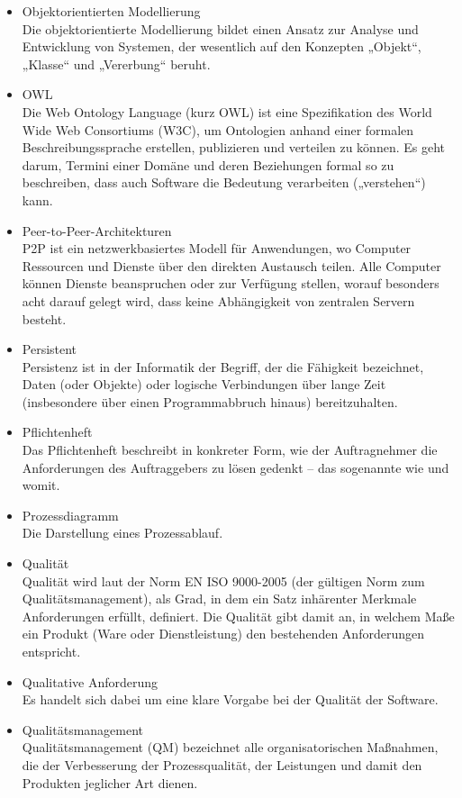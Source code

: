 \begin{itemize}
\item 	Objektorientierten Modellierung\\Die objektorientierte Modellierung bildet einen Ansatz zur Analyse und Entwicklung von Systemen, der wesentlich auf den Konzepten „Objekt“, „Klasse“ und „Vererbung“ beruht.
\item 	OWL\\
Die Web Ontology Language (kurz OWL) ist eine Spezifikation des World Wide Web Consortiums (W3C), um Ontologien anhand einer formalen Beschreibungssprache erstellen, publizieren und verteilen zu können. Es geht darum, Termini einer Domäne und deren Beziehungen formal so zu beschreiben, dass auch Software die Bedeutung verarbeiten („verstehen“) kann.
\item 	Peer-to-Peer-Architekturen\\
P2P ist ein netzwerkbasiertes Modell für Anwendungen, wo Computer Ressourcen und
Dienste über den direkten Austausch teilen. Alle Computer können Dienste beanspruchen
oder zur Verfügung stellen, worauf besonders acht darauf gelegt wird, dass keine
Abhängigkeit von zentralen Servern besteht.
\item 	Persistent\\Persistenz ist in der Informatik der Begriff, der die Fähigkeit bezeichnet, Daten (oder Objekte) oder logische Verbindungen über lange Zeit (insbesondere über einen Programmabbruch hinaus) bereitzuhalten.
\item 	Pflichtenheft\\Das Pflichtenheft beschreibt in konkreter Form, wie der Auftragnehmer die Anforderungen des Auftraggebers zu lösen gedenkt – das sogenannte wie und womit.
\item 	Prozessdiagramm\\Die Darstellung eines Prozessablauf.
\item 	Qualität\\
Qualität wird laut der Norm EN ISO 9000-2005 (der gültigen Norm zum Qualitätsmanagement), als Grad, in dem ein Satz inhärenter Merkmale Anforderungen erfüllt, definiert. Die Qualität gibt damit an, in welchem Maße ein Produkt (Ware oder Dienstleistung) den bestehenden Anforderungen entspricht.
\item 	Qualitative Anforderung\\
Es handelt sich dabei um eine klare Vorgabe bei der Qualität der Software.
\item 	Qualitätsmanagement\\
Qualitätsmanagement (QM) bezeichnet alle organisatorischen Maßnahmen, die der Verbesserung der Prozessqualität, der Leistungen und damit den Produkten jeglicher Art dienen. 

\end{itemize}
